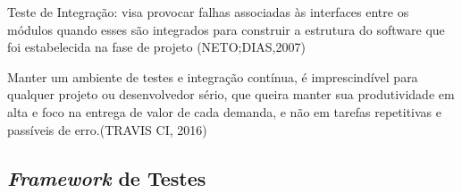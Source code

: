         Teste de Integração: visa provocar falhas associadas às interfaces entre os módulos quando esses são integrados para construir a estrutura do software que foi estabelecida na fase de projeto 
        (NETO;DIAS,2007)

        Manter um ambiente de testes e integração contínua, é imprescindível para qualquer projeto ou desenvolvedor sério, que queira manter sua produtividade em alta e foco na entrega de valor de cada demanda, e não em tarefas repetitivas e passíveis de erro.(TRAVIS CI, 2016)


    \subsection{\textit{Framework} de Testes}
        
